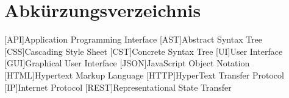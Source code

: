 \chapter*{Abkürzungsverzeichnis}


\begin{acronym}
    [API]{Application Programming Interface}
    [AST]{Abstract Syntax Tree}
    [CSS]{Cascading Style Sheet}
    [CST]{Concrete Syntax Tree}
    [UI]{User Interface}
    [GUI]{Graphical User Interface}
    [JSON]{JavaScript Object Notation}
    [HTML]{Hypertext Markup Language}
    [HTTP]{HyperText Transfer Protocol}
    [IP]{Internet Protocol}
    [REST]{Representational State Transfer}
\end{acronym}


